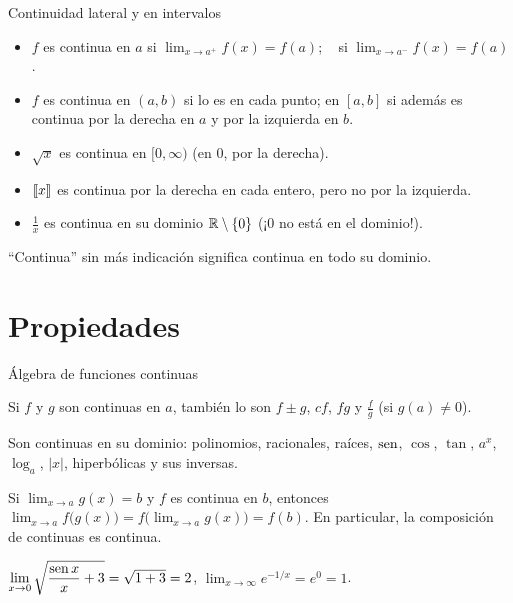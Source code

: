 \documentclass[10pt,aspectratio=169]{beamer}
\begin{document}
\begin{frame}{Continuidad lateral y en intervalos}
  \begin{definicion}
    \begin{itemize}
      \item $f$ es continua  en $a$ si $\lim_{x\to a^+}f(x)=f(a)$; \  si $\lim_{x\to a^-}f(x)=f(a)$.
      \item $f$ es continua en $(a,b)$ si lo es en cada punto; en $[a,b]$ si además es continua por la derecha en $a$ y por la izquierda en $b$.
    \end{itemize}
  \end{definicion}
  \begin{ejemplo}
    \begin{itemize}
      \item $\sqrt x$ es continua en $[0,\infty)$ (en $0$, por la derecha).
      \item $\left\llbracket x\right\rrbracket$ es continua por la derecha en cada entero, pero no por la izquierda.
      \item $\frac1x$ es continua en su dominio $\mathbb{R}\setminus\{0\}$ (¡$0$ no está en el dominio!).
    \end{itemize}
  \end{ejemplo}
  \begin{observacion}
    ``Continua'' sin más indicación significa continua en todo su dominio.
  \end{observacion}
\end{frame}

\section{Propiedades}

\begin{frame}{Álgebra de funciones continuas}
  \begin{teorema}
    Si $f$ y $g$ son continuas en $a$, también lo son $f\pm g$, $cf$, $fg$ y $\frac fg$ (si $g(a)\neq0$).
  \end{teorema}
  \begin{teorema}
    Son continuas en su dominio: polinomios, racionales, raíces, $\operatorname{sen}$, $\cos$, $\tan$, $a^x$, $\log_a$, $|x|$,
    hiperbólicas y sus inversas.
  \end{teorema}
  \begin{teorema}[composición]
    Si $\lim_{x\to a}g(x)=b$ y $f$ es continua en $b$, entonces $\displaystyle\lim_{x\to a}f\big(g(x)\big)=f\Big(\lim_{x\to a}g(x)\Big)=f(b)$.
    En particular, la composición de continuas es continua.
  \end{teorema}
  \begin{ejemplo}
    $\displaystyle\lim_{x\to0}\sqrt{\frac{\operatorname{sen} x}{x}+3}=\sqrt{1+3}=2$, \qquad $\displaystyle\lim_{x\to\infty}e^{-1/x}=e^0=1$.
  \end{ejemplo}
\end{frame}
\end{document}
